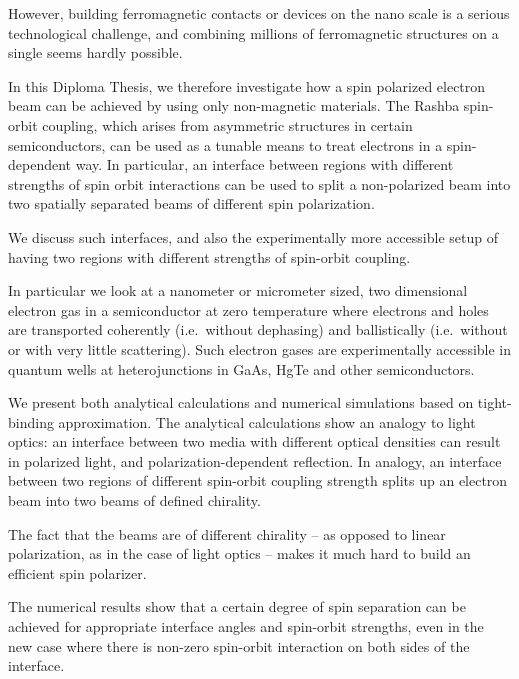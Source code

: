 However, building ferromagnetic contacts or devices on
the nano scale is a serious technological challenge, and combining millions of
ferromagnetic structures on a single seems hardly possible.

In this Diploma Thesis, we therefore investigate how a spin polarized electron
beam can be achieved by using only non-magnetic materials. The Rashba 
spin-orbit coupling, which arises from
asymmetric structures in certain semiconductors, can be used as a tunable
means to treat
electrons in a spin-dependent way. In particular, an interface
between regions with different strengths of spin orbit interactions can be
used to split a non-polarized beam into two spatially separated beams of
different spin polarization.

We discuss such interfaces, and also the experimentally more accessible setup
of having two regions with different strengths of spin-orbit coupling.

In particular we look at a nanometer or micrometer sized, two dimensional
electron gas in a semiconductor at zero temperature where electrons and holes
are transported coherently (i.e.~without dephasing) and ballistically
(i.e.~without or with very little scattering). Such electron gases are
experimentally accessible in quantum wells at heterojunctions in GaAs,
HgTe and other semiconductors.

We present both analytical calculations and numerical simulations based on
tight-binding approximation. The analytical calculations show an analogy to
light optics:  an interface between two media with different optical densities
can result in polarized light, and polarization-dependent reflection. In
analogy, an interface between two regions of different spin-orbit coupling
strength splits up an electron beam into two beams of defined chirality.

The fact that the beams are of different chirality -- as opposed to
linear polarization, as in the case of light optics -- makes it much hard to
build an efficient spin polarizer.

The numerical results show that a certain degree of spin separation can be
achieved for appropriate interface angles and spin-orbit strengths, even in
the new case where there is non-zero spin-orbit interaction on both sides of
the interface.

